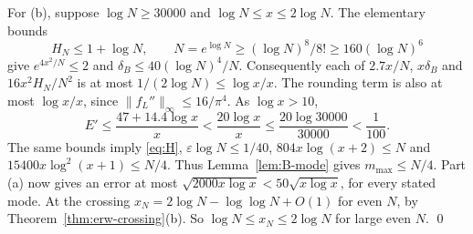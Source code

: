 For (b), suppose $\log N\ge30000$ and $\log N\le x\le2\log N$.
The elementary bounds
\[
 H_N\le1+\log N,\qquad
 N=e^{\log N}\ge(\log N)^8/8!\ge160(\log N)^6
\]
give $e^{4x^2/N}\le2$ and $\delta_B\le40(\log N)^4/N$.
Consequently each of $2.7x/N$, $x\delta_B$ and
$16x^2H_N/N^2$ is at most $1/(2\log N)\le\log x/x$.
The rounding term is also at most $\log x/x$, since
$\|f_L''\|_\infty\le16/\pi^4$. As $\log x>10$,
\[
 E'\le\frac{47+14.4\log x}{x}
       <\frac{20\log x}{x}
       \le\frac{20\log30000}{30000}<\frac1{100}.
\]
The same bounds imply \eqref{eq:H},
$\varepsilon\log N\le1/40$, $804x\log(x+2)\le N$ and
$15400x\log^2(x+1)\le N/4$. Thus Lemma~\ref{lem:B-mode} gives
$m_{\max}\le N/4$. Part (a) now gives an error at most
$\sqrt{2000x\log x}<50\sqrt{x\log x}$, for every stated mode.
At the crossing
$x_N=2\log N-\log\log N+O(1)$ for even $N$, by Theorem~\ref{thm:erw-crossing}(b). So
$\log N\le x_N\le2\log N$ for large even $N$. \qed

